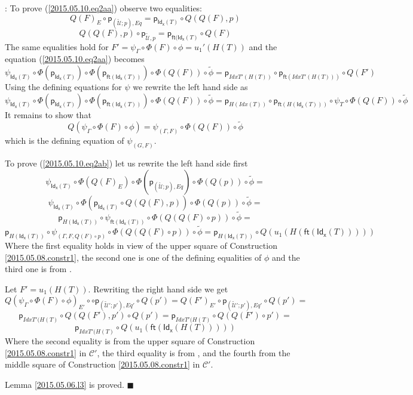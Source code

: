 \documentclass[12pt]{article}
\numberwithin{equation}{section}
\newenvironment{myproof}{{\bf Proof}:}{$\blacksquare$ \vskip 5mm }
\newcommand{\wt}{\widetilde}
\newcommand{\ft}{\mathsf{ft}}
\newcommand{\p}{\mathsf{p}}
\newcommand{\Idx}{\mathsf{Id_x}} %
\newcommand{\U}{\mathcal{U}}
\begin{document}
\begin{myproof}
To prove (\ref{2015.05.10.eq2aa}) observe two equalities:
%
$$Q(F)_E\circ \p_{(\wt{\U};p),Eq}=\p_{\Idx(T)}\circ Q(Q(F),p)$$
%
$$Q(Q(F),p)\circ \p_{\wt{\U},p}=\p_{\ft(\Idx(T)}\circ Q(F)$$
%
The same equalities hold for $F'=\psi_{\Gamma}\circ\Phi(F)\circ
\phi=u_1'(H(T))$ and the equation (\ref{2015.05.10.eq2aa}) becomes
%
$$\psi_{\Idx(T)}\circ \Phi(\p_{\Idx(T)})\circ \Phi(\p_{\ft(\Idx(T))})\circ
\Phi(Q(F))\circ \wt{\phi}=\p_{IdxT'(H(T))}\circ \p_{\ft(IdxT'(H(T)))}\circ Q(F')$$
%
Using the defining equations for $\psi$ we rewrite the left hand side as
%
$$\psi_{\Idx(T)}\circ \Phi(\p_{\Idx(T)})\circ \Phi(\p_{\ft(\Idx(T))})\circ
\Phi(Q(F))\circ \wt{\phi}=\p_{H(Idx(T))}\circ \p_{\ft(H(\Idx(T)))}\circ
\psi_{T}\circ \Phi(Q(F))\circ \wt{\phi}$$
%
It remains to show that
%
$$Q(\psi_{\Gamma}\circ \Phi(F)\circ \phi)=\psi_{(\Gamma,F)}\circ
\Phi(Q(F))\circ \wt{\phi}$$
%
which is the defining equation of $\psi_{(G,F)}$.

To prove (\ref{2015.05.10.eq2ab}) let us rewrite the left hand side first
%
$$\psi_{\Idx(T)}\circ \Phi(Q(F)_E)\circ \Phi(\p_{(\wt{\U};p),Eq})\circ
\Phi(Q(p))\circ \wt{\phi}=$$$$\psi_{\Idx(T)}\circ \Phi(\p_{\Idx(T)}\circ
Q(Q(F),p))\circ \Phi(Q(p))\circ\wt{\phi}=$$$$\p_{H(\Idx(T))}\circ
\psi_{\ft(\Idx(T))}\circ \Phi(Q(Q(F)\circ p))\circ
\wt{\phi}=$$$$\p_{H(\Idx(T))}\circ \psi_{(\Gamma,F,Q(F)\circ p)}\circ
\Phi(Q(Q(F)\circ p))\circ \wt{\phi}=\p_{H(\Idx(T))}\circ
Q(u_1(H(\ft(\Idx(T)))))$$
%
Where the first equality holds in view of the upper square of Construction
\ref{2015.05.08.constr1}, the second one is one of the defining equalities of
$\phi$ and the third one is from \cite[Lemma 3.2]{fromunivwithPi}.

Let $F'=u_1(H(T))$. Rewriting the right hand side we get
%
$$Q(\psi_{\Gamma}\circ \Phi(F)\circ \phi)_{E'}\circ \circ
\p_{(\wt{\U}';p'),Eq'}\circ Q(p')=Q(F')_{E'}\circ \p_{(\wt{\U}';p'),Eq'}\circ
Q(p')=$$
$$\p_{IdxT'(H(T)}\circ Q(Q(F'),p')\circ Q(p')=\p_{IdxT'(H(T)}\circ Q(Q(F')\circ
p')=$$
$$\p_{IdxT'(H(T)}\circ Q(u_1(\ft(\Idx(H(T)))))$$
%
Where the second equality is from the upper square of Construction
\ref{2015.05.08.constr1} in $\mathcal C'$, the third equality is from
\cite[Lemma 3.2]{fromunivwithPi}, and the fourth from the middle square of
Construction \ref{2015.05.08.constr1} in $\mathcal C'$.

Lemma \ref{2015.05.06.l3} is proved.
\end{myproof}
\end{document}
